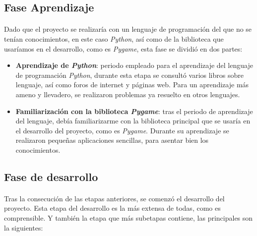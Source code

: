 \documentclass[a4paper,11pt]{article} %
\begin{document}
\subsection{Fase Aprendizaje}

\paragraph{}
Dado que el proyecto se realizaría con un lenguaje de programación del que no se tenían conocimientos, en este caso \emph{Python}, 
así como de la biblioteca que usaríamos en el desarrollo, como es \emph{Pygame}, esta fase se dividió en dos partes:

\begin{itemize}
    \item \textbf{Aprendizaje de \emph{Python}}: periodo empleado para el aprendizaje del lenguaje de programación \emph{Python},
    durante esta etapa se consultó varios libros sobre lenguaje, así como foros de internet y páginas web. Para un aprendizaje más
    ameno y llevadero, se realizaron problemas ya resuelto en otros lenguajes.
    
    \item \textbf{Familiarización con la biblioteca \emph{Pygame}}: tras el periodo de aprendizaje del lenguaje, debía familiarizarme
    con la biblioteca principal que se usaría en el desarrollo del proyecto, como es \emph{Pygame}. Durante su
    aprendizaje se realizaron pequeñas aplicaciones sencillas, para asentar
    bien los conocimientos.
\end{itemize}

\subsection{Fase de desarrollo}

\paragraph{}
Tras la consecución de las etapas anteriores, se comenzó el desarrollo del proyecto. Esta etapa del desarrollo es la más extensa de 
todas, como es comprensible. Y también la etapa que más subetapas contiene, las principales son la siguientes:
\end{document}

